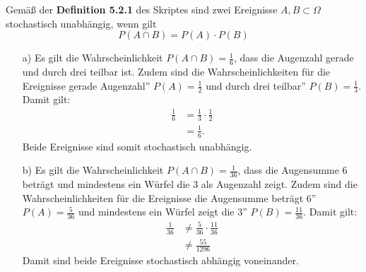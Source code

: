Gemäß der \textbf{Definition 5.2.1} des Skriptes sind zwei Ereignisse $A, B \subset \Omega$ stochastisch unabhängig, wenn gilt
\begin{equation*}
	P(A \cap B) = P(A) \cdot P(B)
\end{equation*}
\begin{enumerate}
	\item[a)] Es gilt die Wahrscheinlichkeit $P(A \cap B) = \frac{1}{6}$, dass die Augenzahl gerade und durch drei teilbar ist. Zudem sind die Wahrscheinlichkeiten für die Ereignisse \glqq gerade Augenzahl'' $P(A)  = \frac{1}{2}$ und \glqq durch drei teilbar'' $P(B) = \frac{1}{3}$. Damit gilt:
	\begin{equation}
		\begin{split}
			\frac{1}{6} &= \frac{1}{3} \cdot \frac{1}{2}\\
						&= \frac{1}{6}.
		\end{split}
	\end{equation}
	Beide Ereignisse sind somit stochastisch unabhängig.
	\item[b)] Es gilt die Wahrscheinlichkeit $P(A \cap B) = \frac{1}{36}$, dass die Augensumme 6 beträgt und mindestens ein Würfel die 3 als Augenzahl zeigt. Zudem sind die Wahrscheinlichkeiten für die Ereignisse \glqq die Augensumme beträgt 6'' $P(A) = \frac{5}{36}$ und \glqq mindestens ein Würfel zeigt die 3'' $P(B) = \frac{11}{36}$. Damit gilt:
	\begin{equation*}
		\begin{split}
			\frac{1}{36} &\neq \frac{5}{36} \cdot \frac{11}{36}\\
						 &\neq \frac{55}{1296}
		\end{split}
	\end{equation*}
	Damit sind beide Ereignisse stochastisch abhängig voneinander.
\end{enumerate}